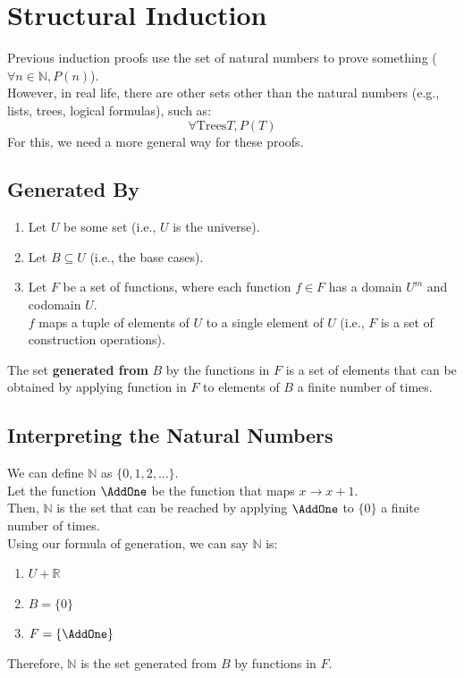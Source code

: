\documentclass{article}
\begin{document}
\section{Structural Induction}
Previous induction proofs use the set of natural numbers to prove something ($\forall n \in \mathbb{N}, P(n)$).\\
However, in real life, there are other sets other than the natural numbers (e.g., lists, trees, logical formulas), such as:
$$\forall \text{Trees} T, P(T)$$
For this, we need a more general way for these proofs.

\subsection{Generated By}
\begin{enumerate}
    \item Let $U$ be some set (i.e., $U$ is the universe).
    \item Let $B \subseteq U$ (i.e., the base cases).
    \item Let $F$ be a set of functions, where each function $f \in F$  has a domain $U^m$ and codomain $U$.\\
    $f$ maps a tuple of elements of $U$ to a single element of $U$ (i.e., $F$ is a set of construction operations).
\end{enumerate}
The set \textbf{generated from} $B$ by the functions in $F$ is a set of elements that can be obtained by applying function in $F$ to elements of $B$ a finite number of times.

\subsection{Interpreting the Natural Numbers}
We can define $\mathbb{N}$ as $\{0, 1, 2, ... \}$.\\
Let the function $\AddOne$ be the function that maps $x \to x + 1$.\\
Then, $\mathbb{N}$ is the set that can be reached by applying $\AddOne$ to $\{0\}$ a finite number of times.
\\
Using our formula of generation, we can say $\mathbb{N}$ is:
\begin{enumerate}
    \item $U + \mathbb{R}$
    \item $B = \{0\}$
    \item $F = \{\AddOne\}$
\end{enumerate}
Therefore, $\mathbb{N}$ is the set generated from $B$ by functions in $F$.
\end{document}
